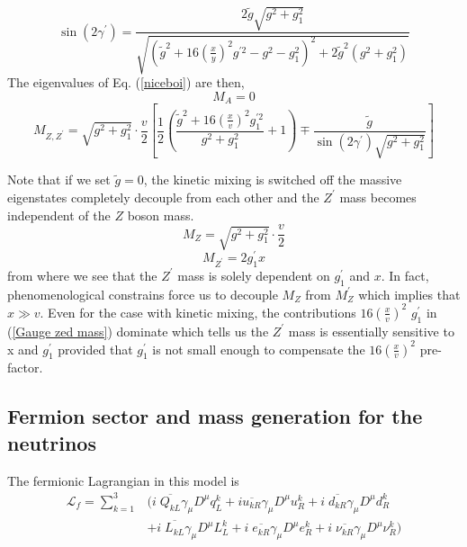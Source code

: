 \documentclass[12pt]{article}
\begin{document}
\begin{equation}
\sin(2 \gamma^\prime) = \frac{2 \tilde{g} \sqrt{g^2 + g^2_1}}{\sqrt{(\tilde{g}^2 + 16 (\frac{x}{y})^2 g^{\prime 2} - g^2 - g^2_1)^2 + 2\tilde{g}^2 (g^2 + g^2_1)} }
\end{equation}
The eigenvalues of Eq. (\ref{niceboi}) are then,
\begin{equation}
M_A=0  \nonumber
\end{equation}
\begin{equation}
M_{Z,Z^\prime}=\sqrt{g^2 + g^2_1} \cdot \frac{v}{2} \left[ \frac{1}{2} \left( \frac{\tilde{g}^2 + 16 (\frac{x}{v})^2 g^{' 2}_1}{g^2 + g^2_1} +1  \right) \mp \frac{\tilde{g}}{\sin(2 \gamma^\prime) \sqrt{g^2 + g^2_1}} \right]
\label{Gauge zed mass}
\end{equation}

Note that if we set $\tilde{g} = 0$, the kinetic mixing is switched off the massive eigenstates completely decouple from each other and the $Z^\prime$ mass becomes independent of the $Z$ boson mass. 
%
\begin{equation}
M_Z = \sqrt{g^2+g^2_1}\cdot \frac{v}{2}
\end{equation}
%
\begin{equation}
M_{Z^\prime} = 2 g^\prime_1 x  
\label{massazaprox}
\end{equation}
%
%
from where we see that the $Z^\prime$ mass is solely dependent on $g_1^\prime$ and $x$. In fact, phenomenological constrains force us to decouple $M_Z$ from $M_Z^\prime$ which implies that $x \gg v$. Even for the case with kinetic mixing, the contributions $16 (\frac{x}{v})^2$ $g_1^\prime$ in (\ref{Gauge zed mass}) dominate which tells us the $Z^\prime$ mass is essentially sensitive to x and $g_1^\prime$ provided that  $g_1^\prime$ is not small enough to compensate the $16 (\frac{x}{v})^2$ pre-factor.

\subsection{Fermion sector and mass generation for the neutrinos}
The fermionic Lagrangian in this model is
\begin{align}
\mathcal{L}_f = \sum_{k=1}^{3}  & ( i \; \overline{Q_{kL}} \gamma_\mu D^\mu q^k_{L} + i \overline{u_{kR}} \gamma_\mu D^\mu u^k_{R} 
 +   i \; \overline{d_{kR}} \gamma_\mu D^\mu d^k_{R}  \\  &  + i \; \overline{L_{kL}} \gamma_\mu D^\mu L^k_{L} + i \; \overline{e_{kR}} \gamma_\mu D^\mu  e^k_{R} + i \; \overline{\nu_{kR}} \gamma_\mu D^\mu \nu^k_{R} )
\end{align}
\end{document}
